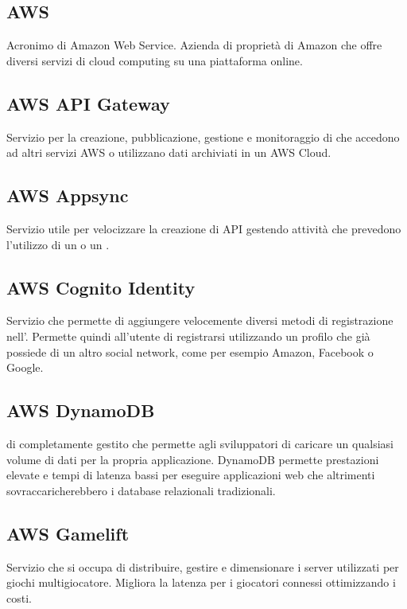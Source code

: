 \subsection*{AWS}
Acronimo di Amazon Web Service. Azienda di proprietà di Amazon che offre diversi servizi di cloud computing su una piattaforma online.

\subsection*{AWS API Gateway}
Servizio  per la creazione, pubblicazione, gestione e monitoraggio di  che accedono ad altri servizi AWS o utilizzano dati archiviati in un AWS Cloud.

\subsection*{AWS Appsync}
Servizio  utile per velocizzare la creazione di API gestendo attività che prevedono l'utilizzo di un  o un .

\subsection*{AWS Cognito Identity}
Servizio  che permette di aggiungere velocemente diversi metodi di registrazione nell'. Permette quindi all'utente di registrarsi utilizzando un profilo che già possiede di un altro social network, come per esempio Amazon, Facebook o Google. 

\subsection*{AWS DynamoDB}
  di  completamente gestito che permette agli sviluppatori di caricare un qualsiasi volume di dati per la propria applicazione. DynamoDB permette prestazioni elevate e tempi di latenza bassi per eseguire applicazioni web che altrimenti sovraccaricherebbero i database relazionali tradizionali.

\subsection*{AWS Gamelift}
Servizio  che si occupa di distribuire, gestire e dimensionare i server  utilizzati per giochi multigiocatore. Migliora la latenza per i giocatori connessi ottimizzando i costi.

